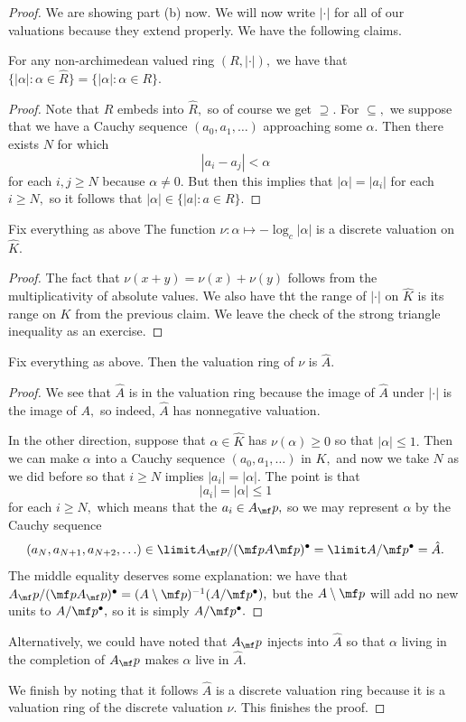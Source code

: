 \documentclass[../notes.tex]{subfiles}
\begin{document}
\begin{proof}
	We are showing part (b) now. We will now write $|\cdot|$ for all of our valuations because they extend properly. We have the following claims.
	\begin{lemma}
		For any non-archimedean valued ring $(R,|\cdot|),$ we have that $\{|\alpha|:\alpha\in\hat R\}=\{|\alpha|:\alpha\in R\}.$
	\end{lemma}
	\begin{proof}
		Note that $R$ embeds into $\hat R,$ so of course we get $\supseteq.$ For $\subseteq,$ we suppose that we have a Cauchy sequence $(a_0,a_1,\ldots)$ approaching some $\alpha.$ Then there exists $N$ for which
		\[|a_i-a_j|<\alpha\]
		for each $i,j\ge N$ because $\alpha\ne0.$ But then this implies that $|\alpha|=|a_i|$ for each $i\ge N,$ so it follows that $|\alpha|\in\{|a|:a\in R\}.$
	\end{proof}
	\begin{lemma}
		Fix everything as above The function $\nu:\alpha\mapsto-\log_c|\alpha|$ is a discrete valuation on $\hat K.$
	\end{lemma}
	\begin{proof}
		The fact that $\nu(x+y)=\nu(x)+\nu(y)$ follows from the multiplicativity of absolute values. We also have tht the range of $|\cdot|$ on $\hat K$ is its range on $K$ from the previous claim. We leave the check of the strong triangle inequality as an exercise.
	\end{proof}
	\begin{lemma} \label{lem:something}
		Fix everything as above. Then the valuation ring of $\nu$ is $\hat A.$
	\end{lemma}
	\begin{proof}
		We see that $\hat A$ is in the valuation ring because the image of $\hat A$ under $|\cdot|$ is the image of $A,$ so indeed, $\hat A$ has nonnegative valuation.

		In the other direction, suppose that $\alpha\in\hat K$ has $\nu(\alpha)\ge0$ so that $|\alpha|\le1.$ Then we can make $\alpha$ into a Cauchy sequence $(a_0,a_1,\ldots)$ in $K,$ and now we take $N$ as we did before so that $i\ge N$ implies $|a_i|=|\alpha|.$ The point is that
		\[|a_i|=|\alpha|\le1\]
		for each $i\ge N,$ which means that the $a_i\in A_\mf p,$ so we may represent $\alpha$ by the Cauchy sequence
		\[(a_N,a_{N+1},a_{N+2},\ldots)\in\limit A_\mf p/(\mf pA\mf p)^\bullet=\limit A/\mf p^\bullet=\hat A.\]
		The middle equality deserves some explanation: we have that $A_\mf p/(\mf pA_\mf p)^\bullet=(A\setminus\mf p)^{-1}(A/\mf p^\bullet),$ but the $A\setminus\mf p$ will add no new units to $A/\mf p^\bullet,$ so it is simply $A/\mf p^\bullet.$
	\end{proof}
	\begin{remark}
		Alternatively, we could have noted that $A_\mf p$ injects into $\hat A$ so that $\alpha$ living in the completion of $A_\mf p$ makes $\alpha$ live in $\hat A.$
	\end{remark}
	We finish by noting that it follows $\hat A$ is a discrete valuation ring because it is a valuation ring of the discrete valuation $\nu.$ This finishes the proof.
\end{proof}
\end{document}
